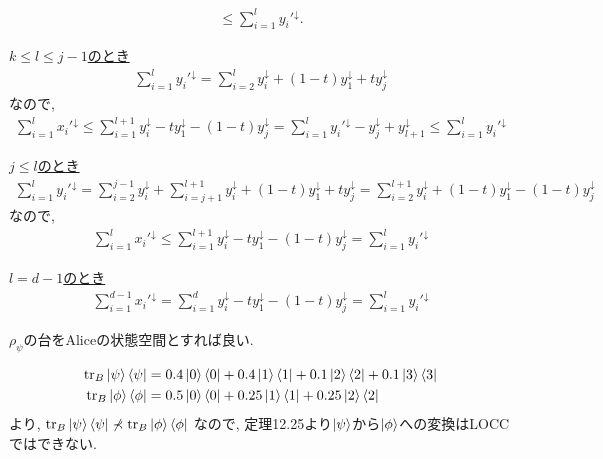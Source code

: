 \begin{ex}
\begin{align*}
        \le
        \sum_{i=1}^l y_i'^\downarrow.
    \end{align*}
    \par
    \underline{$k \le l \le j - 1 $のとき}\
    \begin{align*}
        \sum_{i=1}^l y_i'^\downarrow = \sum_{i=2}^{l} y_i^\downarrow + (1-t) y_1^\downarrow + t y_j^\downarrow
    \end{align*}
    なので,
    \begin{align*}
        \sum_{i=1}^l x_i'^\downarrow
        \le
        \sum_{i=1}^{l+1} y_i^\downarrow - t y_1^\downarrow - (1-t)y_j^\downarrow
        =
        \sum_{i=1}^l y_i'^\downarrow - y_j^\downarrow + y_{l+1}^\downarrow
        \le
        \sum_{i=1}^l y_i'^\downarrow
    \end{align*}
    \par
    \underline{$j \le l $のとき}\
    \begin{align*}
        \sum_{i=1}^l y_i'^\downarrow = \sum_{i=2}^{j-1} y_i^\downarrow + \sum_{i=j+1}^{l+1} y_i^\downarrow + (1-t) y_1^\downarrow + t y_j^\downarrow
        =
        \sum_{i=2}^{l+1} y_i^\downarrow + (1-t) y_1^\downarrow - (1- t)  y_j^\downarrow
    \end{align*}
    なので,
    \begin{align*}
        \sum_{i=1}^l x_i'^\downarrow
        \le
        \sum_{i=1}^{l+1} y_i^\downarrow - t y_1^\downarrow - (1-t)y_j^\downarrow
        =
        \sum_{i=1}^l y_i'^\downarrow
    \end{align*}
    \par
    \underline{$l = d - 1 $のとき}\
    \begin{align*}
        \sum_{i=1}^{d-1} x_i'^\downarrow
        =
        \sum_{i=1}^{d} y_i^\downarrow - t y_1^\downarrow - (1-t)y_j^\downarrow
        =
        \sum_{i=1}^l y_i'^\downarrow
    \end{align*}
\end{ex}

\begin{ex}
    \label{ex12.20}
    $\rho_\psi$の台をAliceの状態空間とすれば良い.
\end{ex}

\begin{ex}
    \label{ex12.21}
    \begin{align*}
        \mathrm{tr}_B \ket{\psi}\bra{\psi}
         & = 0.4 \ket{0}\bra{0} + 0.4 \ket{1}\bra{1} + 0.1 \ket{2}\bra{2} + 0.1 \ket{3}\bra{3}
        \\
        \mathrm{tr}_B \ket{\phi}\bra{\phi}
         & = 0.5 \ket{0}\bra{0} + 0.25 \ket{1}\bra{1} + 0.25 \ket{2}\bra{2}
    \end{align*}
    より, $\mathrm{tr}_B \ket{\psi}\bra{\psi} \nprec \mathrm{tr}_B \ket{\phi}\bra{\phi}$
    なので, 定理12.25より$\ket{\psi}$から$\ket{\phi}$への変換はLOCCではできない.
\end{ex}

